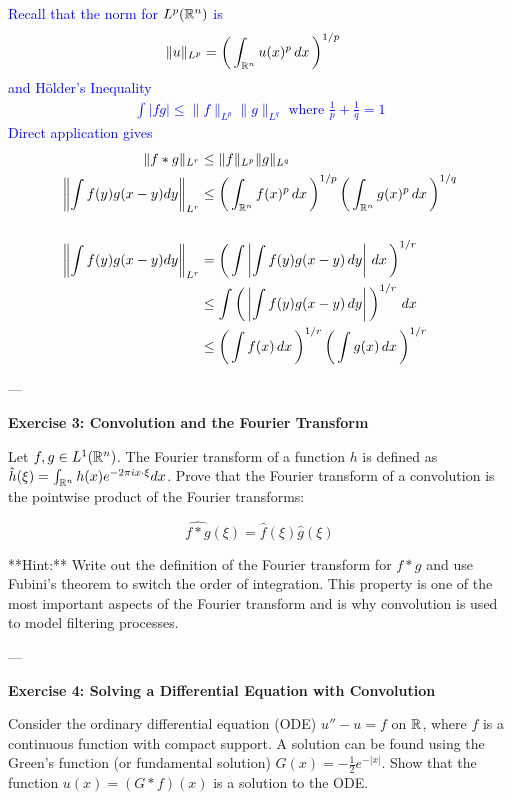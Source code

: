 \documentclass[12pt,a4paper]{report}
\newcommand{\BLUE}[1]{\textcolor{blue}{#1}}
\begin{document}
\begin{description}
\begin{description}
\BLUE{Recall that the norm for $L^p(\mathbb{R}^n)$ is
\begin{align*}
	\|u\|_{L^p} &= \left (\, \int_{\mathbb{R}^n} u(x)^p\, dx  \,\right )^{1/p}
\end{align*}and H\"older's Inequality
\begin{align*}
	\int |fg| \le \|f\|_{L^p}\|g\|_{L^q} \text{ where } \frac{1}{p}+\frac{1}{q}=1
\end{align*}Direct application gives
\begin{align*}
	\|f * g\|_{L^r} &\leq \|f\|_{L^p} \|g\|_{L^q} \\
	\left \| \int f(y)g(x-y) dy \right \|_{L^r} &\le \left (\, \int_{\mathbb{R}^n} f(x)^p\, dx  \,\right )^{1/p}\left (\, \int_{\mathbb{R}^n} g(x)^p\, dx  \,\right )^{1/q} \\ \\
	\left \| \int f(y)g(x-y) dy \right \|_{L^r} &= \left (\, \int \left | \int f(y)g(x-y)\, dy \right | \, dx \,\right )^{1/r} \\
	&\le \int \left (\, \left | \int f(y)g(x-y)\, dy \right | \,\right )^{1/r} \, dx \\
	&\le \left (\, \int f(x)\,dx \,\right )^{1/r}\left (\, \int g(x)\,dx \,\right )^{1/r}
\end{align*}
}

---

\item \textbf{Exercise 3: Convolution and the Fourier Transform}

Let \( f, g \in L^1(\mathbb{R}^n) \). The Fourier transform of a function \( h \) is defined as \( \hat{h}(\xi) = \int_{\mathbb{R}^n} h(x) e^{-2\pi i x \cdot \xi} dx \). Prove that the Fourier transform of a convolution is the pointwise product of the Fourier transforms:

\[ \widehat{f * g}(\xi) = \hat{f}(\xi) \hat{g}(\xi) \]

**Hint:** Write out the definition of the Fourier transform for \( f * g \) and use Fubini's theorem to switch the order of integration. This property is one of the most important aspects of the Fourier transform and is why convolution is used to model filtering processes.

---

\item  \textbf{Exercise 4: Solving a Differential Equation with Convolution}

Consider the ordinary differential equation (ODE) \( u'' - u = f \) on \( \mathbb{R} \), where \( f \) is a continuous function with compact support. A solution can be found using the Green's function (or fundamental solution) \( G(x) = -\frac{1}{2}e^{-|x|} \). Show that the function \( u(x) = (G * f)(x) \) is a solution to the ODE.


\end{description}
\end{description}
\end{document}
